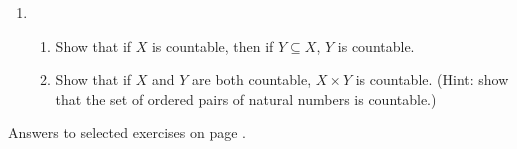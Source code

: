 {\begin{enumerate}
\item \begin{enumerate}
	\item Show that if $X$ is countable, then if $Y \subseteq X$, $Y$ is countable.
\item Show that if $X$ and $Y$ are both countable, $X \times Y$ is countable. (Hint: show that the set of ordered pairs of natural numbers is countable.)

\end{enumerate}





\end{enumerate}

Answers to selected exercises on page \pageref{ans2}.
}


